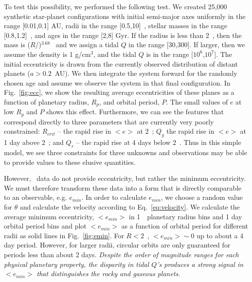 To test this possibility, we performed the following test. We created
25,000 synthetic star-planet configurations with initial semi-major
axes uniformly in the range [0.01,0.1] AU, radii in the range
[0.5,10]~\rearth, stellar masses in the range [0.8,1.2]~\msun, and
ages in the range [2,8] Gyr. If the radius is less than 2~\rearth,
then the mass is ($R$/\rearth)$^{3.68}$\mearth~\cite{Sotin07} and we
assign a tidal $Q$ in the range [30,300]. If larger, then we assume
the density is 1 g/cm$^3$, and the tidal $Q$ is in the range
[$10^6$,$10^7$]. The initial eccentricity is drawn from the currently
observed distribution of distant planets ($a > 0.2$~AU). We then
integrate the system forward for the randomly chosen age and assume we
observe the system in that final configuration. In Fig.~\ref{fig:ecc},
we show the resulting average eccentricities of these planes as a
function of planetary radius, $R_p$, and orbital period, $P$. The
small values of $e$ at low $R_p$ and $P$ shows this
effect. Furthermore, we can see the features that correspond directly
to three parameters that are currently very poorly constrained:
$R_{crit}$ -- the rapid rise in $<e>$ at 2~\rearth; $Q_g$ the rapid
rise in $<e>$ at 1 day above 2~\rearth; and $Q_r$ -- the rapid rise at
4 days below 2~\rearth. Thus in this simple model, we see three
constraints for three unknowns and observations may be able to provide
values to these elusive quantities.

However, \kepler~data do not provide eccentricity, but rather the
minimum eccentricity. We must therefore transform these data into a
form that is directly comparable to an observable, e.g. $e_{min}$. In
order to calculate $e_{min}$, we choose a random value for $\theta$
and calculate the velocity according to Eq.~\ref{eq:velocity}. We
calculate the average minimum eccentricity, $<e_{min}>$ in
1~\rearth~planetary radius bins and 1 day orbital period bins and plot
$<e_{min}>$ as a function of orbital period for different radii as
solid lines in Fig.~\ref{fig:emin}. For $R < 2$~\rearth, $<e_{min}>
\sim 0$ up to about a 4 day period. However, for larger radii,
circular orbits are only guaranteed for periods less than about 2
days. \textit{Despite the order of magnitude ranges for each physical
  planetary property, the disparity in tidal $Q$'s produces a strong
  signal in $<e_{min}>$ that distinguishes the rocky and gaseous
  planets. }

